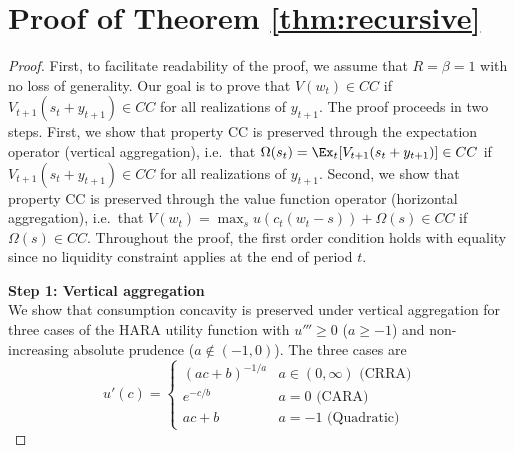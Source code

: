 \section{Proof of Theorem \ref{thm:recursive}}\label{app:recursive}

\begin{proof}
	First, to facilitate readability of the proof, we assume that $R = \beta = 1$ with no loss of generality. Our goal is to prove that $V(w_t) \in CC$ if $V_{t+1}(s_t + {y}_{t+1}) \in CC$ for all realizations of ${y}_{t+1}$. The proof proceeds in two steps. First, we show that property CC is preserved through the expectation operator (vertical aggregation), i.e.\ that $\Omega(s_t) = \Ex_t[V_{t+1}(s_t + {y}_{t+1})] \in CC$ if $V_{t+1}(s_t + {y}_{t+1}) \in CC$ for all realizations of ${y}_{t+1}$. Second, we show that property CC is preserved through the value function operator (horizontal aggregation), i.e.\ that $V(w_t) = \max_{s} u(c_t(w_t - s)) + \Omega(s) \in CC$ if $\Omega(s) \in CC$. Throughout the proof, the first order condition holds with equality since no liquidity constraint applies at the end of period $t$.
	
	\bigskip
	\noindent \textbf{Step 1: Vertical aggregation} \\
	\noindent We show that consumption concavity is preserved under vertical aggregation for three cases of the HARA utility function with $u''' \geq 0$ ($a \geq -1$) and non-increasing absolute prudence ($a \notin (-1,0)$). The three cases are
	\begin{equation}\label{eq:HARAmu}u'(c) = \begin{cases} \left(ac + b\right)^{-1/a} & a \in (0,\infty) \text{ (CRRA)} \\
	e^{-c/b} & a = 0 \text{ (CARA)}\\
	ac + b & a = -1 \text{ (Quadratic)}\end{cases} \end{equation}
	

\end{proof}

